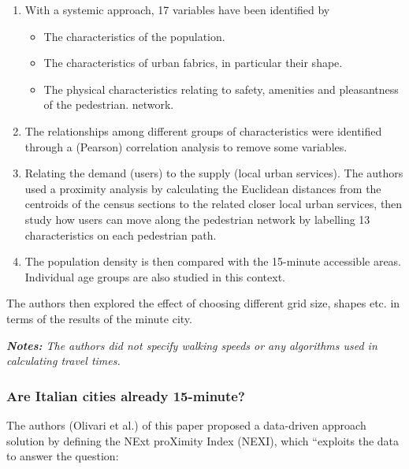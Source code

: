 \begin{enumerate}
\item With a systemic approach, 17 variables have been identified by
\begin{itemize}
    \item The characteristics of the population.
    \item The characteristics of urban fabrics, in particular their shape.
    \item The physical characteristics relating to safety, amenities and pleasantness of the pedestrian.
    network.
\end{itemize}
\item The relationships among different groups of characteristics were identified through a (Pearson) correlation analysis to remove some variables.
\item Relating the demand (users) to the supply (local urban services). The authors used a proximity analysis by calculating the Euclidean distances from the centroids of the census sections to the related closer local urban services, then study how users can move along the pedestrian network by labelling 13 characteristics on each pedestrian path. 
\item The population density is then compared with the 15-minute accessible areas. Individual age groups are also studied in this context.
\end{enumerate}

The authors then explored the effect of choosing different grid size, shapes etc. in terms of the results of the minute city.

\textit{\textbf{Notes:} The authors did not specify walking speeds or any algorithms used in calculating travel times.}

\subsubsection{Are Italian cities already 15-minute?}

The authors (Olivari et al.) of this paper proposed a data-driven approach solution by defining the NExt proXimity Index (NEXI), which “exploits the data to answer the question:  \cite{olivari_are_2023}

